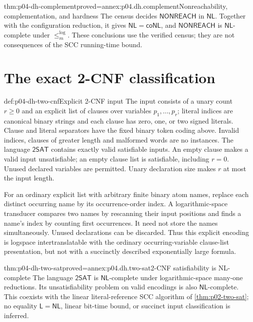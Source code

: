 \begin{hbtheorem}{thm:p04-dh-complement}{proved=annex:p04.dh.complement}{Nonreachability, complementation, and hardness}
The census decides \(\mathsf{NONREACH}\) in \(\mathsf{NL}\).
Together with the configuration reduction, it gives
\(\mathsf{NL}=\mathsf{coNL}\), and \(\mathsf{NONREACH}\) is
\(\mathsf{NL}\)-complete under \(\leq_m^{\log}\).
These conclusions use the verified census; they are not consequences of
the SCC running-time bound.
\end{hbtheorem}

\section{The exact 2-CNF classification}
\label{sec:p04-dh-two-cnf}

\begin{hbdefinition}{def:p04-dh-two-cnf}{Explicit 2-CNF input}
The input consists of a unary count \(r\geq0\) and an explicit list of
clauses over variables \(p_1,\ldots,p_r\); literal indices are canonical
binary strings and each clause has zero, one, or two signed literals.
Clause and literal separators have the fixed binary token coding above.
Invalid indices, clauses of greater length and malformed words are no
instances. The language \(\mathsf{2SAT}\) contains exactly valid
satisfiable inputs. An empty clause makes a valid input unsatisfiable;
an empty clause list is satisfiable, including \(r=0\).
Unused declared variables are permitted. Unary declaration size makes
\(r\) at most the input length.

For an ordinary explicit list with arbitrary finite binary atom names,
replace each distinct occurring name by its occurrence-order index.
A logarithmic-space transducer compares two names by rescanning their
input positions and finds a name's index by counting first occurrences.
It need not store the names simultaneously. Unused declarations can be
discarded. Thus this explicit encoding is logspace intertranslatable
with the ordinary occurring-variable clause-list presentation, but not
with a succinctly described exponentially large formula.
\end{hbdefinition}

\begin{hbtheorem}{thm:p04-dh-two-sat}{proved=annex:p04.dh.two-sat}{2-CNF satisfiability is NL-complete}
The language \(\mathsf{2SAT}\) is \(\mathsf{NL}\)-complete under
logarithmic-space many-one reductions. Its unsatisfiability problem on
valid encodings is also \(\mathsf{NL}\)-complete. This coexists with the
linear literal-reference SCC algorithm of \cref{thm:p02-two-sat};
no equality \(\mathsf L=\mathsf{NL}\), linear bit-time bound, or succinct
input classification is inferred.
\end{hbtheorem}


